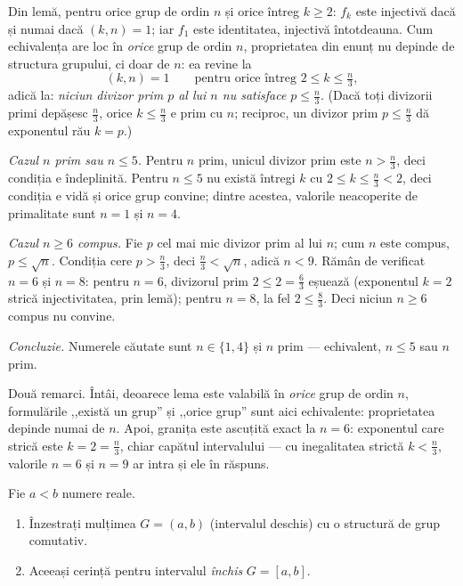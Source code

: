 \begin{solutie}
Din lemă, pentru orice grup de ordin $n$ și orice întreg
$k\ge 2$: $f_{k}$ este injectivă dacă și numai dacă
$(k,n)=1$; iar $f_{1}$ este identitatea, injectivă întotdeauna.
Cum echivalența are loc în \emph{orice} grup de ordin $n$,
proprietatea din enunț nu depinde de structura grupului, ci doar de $n$:
ea revine la
\[
  (k,n)=1 \qquad\text{pentru orice întreg } 2\le k\le \tfrac{n}{3},
\]
adică la: \emph{niciun divizor prim $p$ al lui $n$ nu satisface
$p\le \tfrac{n}{3}$}. (Dacă toți divizorii primi depășesc
$\tfrac n3$, orice $k\le\tfrac n3$ e prim cu $n$; reciproc, un divizor prim
$p\le\tfrac n3$ dă exponentul rău $k=p$.)

\smallskip
\textit{Cazul $n$ prim sau $n\le 5$.} Pentru $n$ prim, unicul divizor prim
este $n>\tfrac{n}{3}$, deci condiția e îndeplinită. Pentru
$n\le 5$ nu există întregi $k$ cu $2\le k\le\tfrac{n}{3}<2$, deci
condiția e vidă și orice grup convine; dintre acestea, valorile
neacoperite de primalitate sunt $n=1$ și $n=4$.

\smallskip
\textit{Cazul $n\ge 6$ compus.} Fie $p$ cel mai mic divizor prim al lui
$n$; cum $n$ este compus, $p\le\sqrt{n}$. Condiția cere
$p>\tfrac{n}{3}$, deci $\tfrac{n}{3}<\sqrt{n}$, adică $n<9$. Rămân
de verificat $n=6$ și $n=8$: pentru $n=6$, divizorul prim $2\le 2=\tfrac63$
eșuează (exponentul $k=2$ strică injectivitatea, prin lemă);
pentru $n=8$, la fel $2\le\tfrac83$. Deci niciun $n\ge 6$ compus nu convine.

\smallskip
\textit{Concluzie.} Numerele căutate sunt $n\in\{1,4\}$ și $n$ prim
--- echivalent, $n\le 5$ sau $n$ prim.
\end{solutie}

\begin{obs}
Două remarci. Întâi, deoarece lema este valabilă în
\emph{orice} grup de ordin $n$, formulările ,,există un grup'' și
,,orice grup'' sunt aici echivalente: proprietatea depinde numai de $n$.
Apoi, granița este ascuțită exact la $n=6$: exponentul care
strică este $k=2=\tfrac{n}{3}$, chiar capătul intervalului --- cu
inegalitatea strictă $k<\tfrac{n}{3}$, valorile $n=6$ și $n=9$ ar
intra și ele în răspuns.
\end{obs}

\begin{problema}[Clasică]
Fie $a<b$ numere reale.
\begin{enumerate}[label=(\alph*),nosep]
  \item Înzestrați mulțimea $G=(a,b)$ (intervalul deschis) cu o
        structură de grup comutativ.
  \item Aceeași cerință pentru intervalul \emph{închis}
        $G=[a,b]$.
\end{enumerate}
\end{problema}

